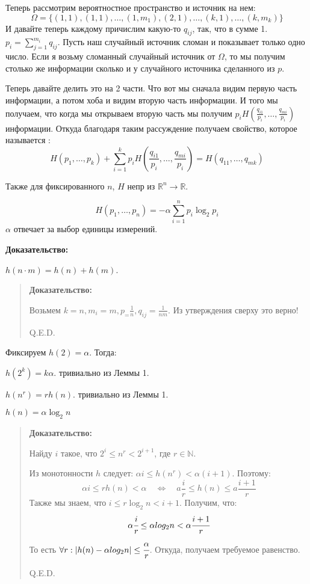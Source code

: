 Теперь рассмотрим вероятностное пространство и источник на нем:
$$\Omega = \{(1,1),(1,1),\ldots,(1,m_1),(2,1),\ldots,(k,1),\ldots,(k,m_k)\}$$
И давайте теперь каждому причислим какую-то $q_{ij}$, так, что в сумме 1. $p_i = \sum\limits_{j=1}^{m_i}q_{ij}$. Пусть наш случайный источник сломан и показывает  только одно число. Если я возьму сломанный случайный источник от $\Omega$, то мы получим столько же информации сколько и у случайного источника сделанного из $p$. 

Теперь давайте делить это на 2 части. Что вот мы сначала видим первую часть информации, а потом хоба и видим вторую часть информации. И того мы получаем, что когда мы открываем вторую часть мы получим $p_i H(\frac{q_{i1}}{p_i},\ldots, \frac{q_{mi}}{p_i} )$ информации. Откуда благодаря таким рассуждение получаем свойство, которое называется :
$$H(p_1,\ldots,p_k)+\sum\limits_{i=1}^kp_iH(\frac{q_{i1}}{p_i},\ldots, \frac{q_{mi}}{p_i}) = H(q_{11},\ldots, q_{mk})$$

Также для фиксированного $n$, $H$ непр из $\mathbb{R}^n\rightarrow \mathbb{R}$. 



$$H(p_1,\ldots,p_n)=-\alpha\sum\limits_{i=1}^np_i\log_2 p_i$$
$\alpha$ отвечает за выбор единицы измерений.

\textbf{Доказательство:}

 $h(n\cdot m) =h(n) + h(m)$.
\begin{quote}
     \textbf{Доказательство:}

     Возьмем  $k=n, m_i=m,p_ = \frac{1}{n},q_{ij} = \frac{1}{nm}$. Из утверждения сверху это верно!
     
\hfill Q.E.D.
\end{quote}
Фиксируем $h(2)=\alpha$. Тогда:

  $h(2^k)=k\alpha$. тривиально из Леммы 1.

  $h(n^r)=rh(n)$. тривиально из Леммы 1.

 $h(n) = \alpha \log_2n $
\begin{quote}
 \textbf{Доказательство:}

 Найду $i$ такое, что $2^i\leq n^r <2^{i+1}$, где $r\in \mathbb{N}$.
 
 Из монотонности $h$ следует: $\alpha i\leq h(n^r) <\alpha (i+1)$. Поэтому:
 $$\alpha i\leq rh(n) <\alpha \quad\Leftrightarrow\quad a\frac{i}{r}\leq h(n)\leq a\frac{i+1}{r}$$
Также мы знаем, что $i\leq r \log_2 n < i+1$. Получим, что:
$$\alpha \cfrac{i}{r}\leq \alpha log_2 n < \alpha \cfrac{i+1}{r}$$
То есть $\forall r :|h(n)-\alpha log_2n|\leq \cfrac{\alpha}{r}$. Откуда, получаем требуемое равенство.
 
 
 \hfill Q.E.D.
\end{quote}

